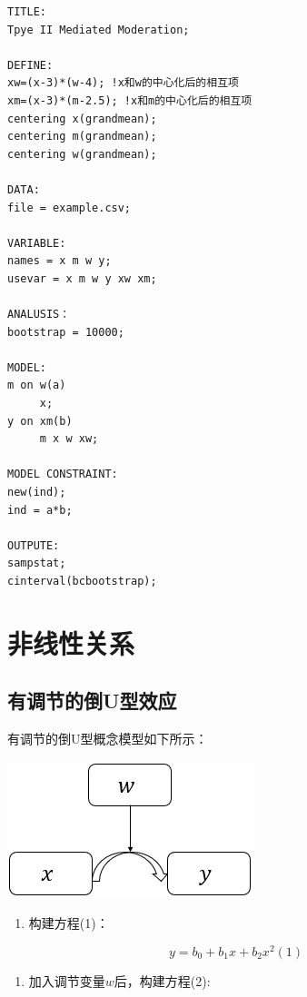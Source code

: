 \documentclass[
]{book}
\providecommand{\tightlist}{%
  \setlength{\itemsep}{0pt}\setlength{\parskip}{0pt}}
\begin{document}
\begin{verbatim}
TITLE:
Tpye II Mediated Moderation;

DEFINE:
xw=(x-3)*(w-4); !x和w的中心化后的相互项 
xm=(x-3)*(m-2.5); !x和m的中心化后的相互项 
centering x(grandmean); 
centering m(grandmean); 
centering w(grandmean); 

DATA:
file = example.csv;

VARIABLE:
names = x m w y;
usevar = x m w y xw xm;

ANALUSIS：
bootstrap = 10000;

MODEL:
m on w(a)
     x;
y on xm(b)
     m x w xw;

MODEL CONSTRAINT:
new(ind);
ind = a*b;

OUTPUTE:
sampstat;
cinterval(bcbootstrap);
\end{verbatim}

\hypertarget{nonlinear}{%
\section{非线性关系}\label{nonlinear}}

\hypertarget{ux6709ux8c03ux8282ux7684ux5012uux578bux6548ux5e94}{%
\subsection{有调节的倒U型效应}\label{ux6709ux8c03ux8282ux7684ux5012uux578bux6548ux5e94}}

有调节的倒U型概念模型如下所示：

\includegraphics{figs/1121.png}

\begin{enumerate}
\def\labelenumi{\arabic{enumi}.}
\tightlist
\item
  构建方程(1)：
\end{enumerate}

\[
y=b_{0}+b_{1}x+b_{2}x^{2}(1)
\]

\begin{enumerate}
\def\labelenumi{\arabic{enumi}.}
\setcounter{enumi}{1}
\tightlist
\item
  加入调节变量\(w\)后，构建方程(2):
\end{enumerate}
\end{document}
